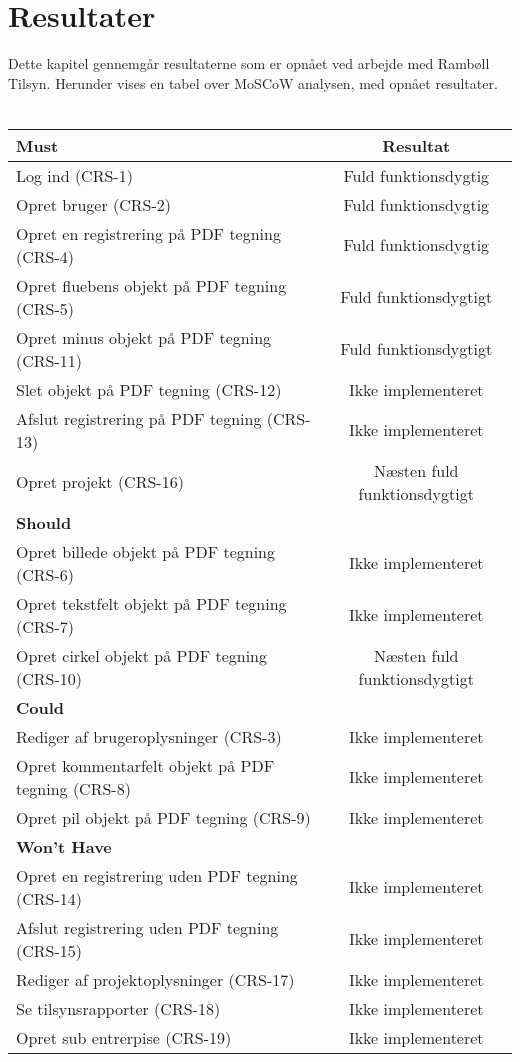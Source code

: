 \chapter{Resultater}
Dette kapitel gennemgår resultaterne som er opnået ved arbejde med Rambøll Tilsyn. Herunder vises en tabel over MoSCoW analysen, med opnået resultater.\\ \\
\begin{tabular}{ l | c  }
	\hline
	\textbf{Must} & \textbf{Resultat} \\ \hline
	Log ind (CRS-1) & Fuld funktionsdygtig \\
	\hline
	Opret bruger (CRS-2) & Fuld funktionsdygtig \\
	\hline
	Opret en registrering på PDF tegning (CRS-4) & Fuld funktionsdygtig\\
	\hline
	Opret fluebens objekt på PDF tegning (CRS-5) & Fuld funktionsdygtigt\\
	\hline
	Opret minus objekt på PDF tegning (CRS-11) & Fuld funktionsdygtigt\\
	\hline
	Slet objekt på PDF tegning (CRS-12) & Ikke implementeret\\
	\hline
	Afslut registrering på PDF tegning (CRS-13) & Ikke implementeret\\
	\hline
	Opret projekt (CRS-16) & Næsten fuld funktionsdygtigt\\
	\hline
	\hline
	\textbf{Should} &  \\ \hline
	Opret billede objekt på PDF tegning (CRS-6) & Ikke implementeret\\
	\hline
	Opret tekstfelt objekt på PDF tegning (CRS-7) & Ikke implementeret\\
	\hline
	Opret cirkel objekt på PDF tegning (CRS-10) & Næsten fuld funktionsdygtigt\\
	\hline
	\hline
	\textbf{Could} &  \\ \hline
	Rediger af brugeroplysninger (CRS-3) & Ikke implementeret\\
	\hline
	Opret kommentarfelt objekt på PDF tegning (CRS-8)  & Ikke implementeret\\
	\hline
	Opret pil objekt på PDF tegning (CRS-9) & Ikke implementeret\\
	\hline
	\hline
	\textbf{Won't Have} & \\ \hline
	Opret en registrering uden PDF tegning (CRS-14) & Ikke implementeret\\
	\hline
	Afslut registrering uden PDF tegning (CRS-15) & Ikke implementeret\\
	\hline
	Rediger af projektoplysninger (CRS-17) & Ikke implementeret\\
	\hline
	Se tilsynsrapporter (CRS-18) & Ikke implementeret\\
	\hline
	Opret sub entrerpise (CRS-19) & Ikke implementeret\\
	\hline
\end{tabular} \\


